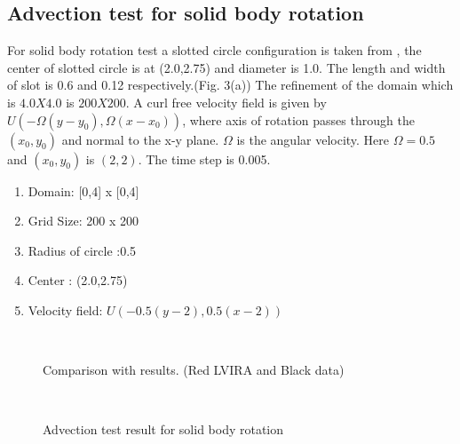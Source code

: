 \subsection{Advection test for solid body rotation}
For solid body rotation test a slotted circle configuration is taken from \cite{Zalesak1979}, the center of slotted circle is at
(2.0,2.75) and diameter is 1.0. The length and width of slot is 0.6 and 0.12 respectively.(Fig. 3(a))  The refinement of the domain which is $4.0X4.0$ is $200X200$.
A curl free velocity field is given by $U(-\Omega(y-y_0),\Omega(x-x_0))$, where axis of rotation passes through the $(x_0,y_0)$ and normal to the x-y plane. $\Omega$ is 
the angular velocity. Here $\Omega = 0.5$ and $(x_0,y_0)$ is $(2,2)$. The time step is 0.005.

   \begin{enumerate}
   \setlength\itemsep{1em}
 \item Domain: [0,4] x [0,4]
 \item Grid Size: 200 x 200
 \item Radius of circle :0.5
 \item Center : (2.0,2.75)
 \item Velocity field:  $U(-0.5(y-2),0.5(x-2))$
 \end{enumerate}

\begin{figure}[H]
 \centering 
  \\
 \caption{Comparison with \cite{Rudman1997} results. (Red LVIRA and Black \cite{Rudman1997} data)}
\end{figure}
% 
\begin{figure}[H]
     \\
 \caption{Advection test result for solid body rotation}
\end{figure}
% 

